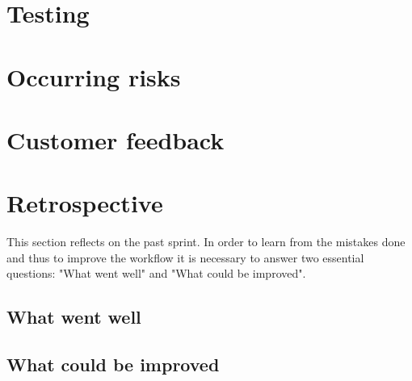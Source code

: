 \section{Testing}
\section{Occurring risks}
\section{Customer feedback}
\section{Retrospective}
This section reflects on the past sprint. In order to learn from the mistakes done and thus to improve the workflow it is necessary to answer two essential questions: "What went well" and "What could be improved".

\subsection{What went well}
\subsection{What could be improved}
